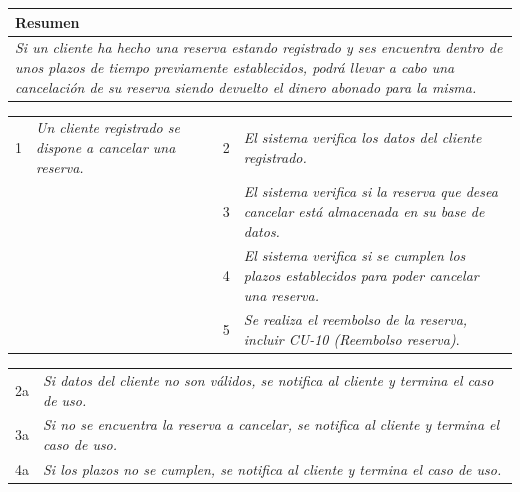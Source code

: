     \begin{table}[H]
        \begin{tabular}{llllllll}
        \hline
        \multicolumn{8}{|l|}{\cellcolor[HTML]{F2F2F2}Resumen}                                                                                                                                                                                                                                                                                                                                                                                             \\ \hline
        \multicolumn{8}{|p{15cm}|}{{\color[HTML]{808080} \textit{Si un cliente ha hecho una reserva estando registrado y ses encuentra dentro de unos plazos de tiempo previamente establecidos, podrá llevar a cabo una cancelación de su reserva siendo devuelto el dinero abonado para la misma.}}} \\ \hline
        \end{tabular}
    \end{table}
    
    \begin{table}[h!]
        \centering
        \begin{tabular}{|p{0.6cm}|p{6.5cm}|p{0.6cm}|p{6.5cm}|}
        \rowcolor{lightgray}
        \hline
        \multicolumn{4}{|l|}{Curso Normal (Básico)} \\
        \hline
        1 & \color[HTML]{808080}\textit{Un cliente registrado se dispone a cancelar una reserva.} & 2 & \color[HTML]{808080}\textit{El sistema verifica los datos del cliente registrado.} \\
        \hline
        & & 3 & \color[HTML]{808080}\textit{El sistema verifica si la reserva que desea cancelar está almacenada en su base de datos.} \\
        \hline
        & & 4 & \color[HTML]{808080}\textit{El sistema verifica si se cumplen los plazos establecidos para poder cancelar una reserva.} \\
        \hline
        & & 5 & \color[HTML]{808080}\textit{Se realiza el reembolso de la reserva, incluir CU-10 (Reembolso reserva)}. \\
        \hline
        \end{tabular}
        \end{table}
        
    \begin{table}[h!]
\centering
\begin{tabular}{|p{0.6cm}|p{13.4cm}|}
\rowcolor{lightgray}
\hline
\multicolumn{2}{|l|}{Cursos Alternos} \\
\hline
2a & \color[HTML]{808080}\textit{Si datos del cliente no son válidos, se notifica al cliente y termina el caso de uso.} \\
\hline
3a & \color[HTML]{808080}\textit{Si no se encuentra la reserva a cancelar, se notifica al cliente y termina el caso de uso.} \\
\hline
4a & \color[HTML]{808080}\textit{Si los plazos no se cumplen, se notifica al cliente y termina el caso de uso.} \\
\hline
\end{tabular}
\end{table}


